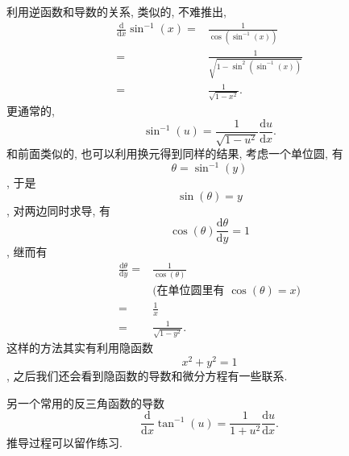 利用逆函数和导数的关系, 类似的, 不难推出, \[
\begin{aligned}
\frac{\mathrm{d}}{\mathrm{d}x}\sin^{-1}(x)=&\frac{1}{\cos(\sin^{-1}(x))}\\
=&\frac{1}{\sqrt{1-\sin^2(\sin^{-1}(x))}}\\
=&\frac{1}{\sqrt{1-x^2}}.
\end{aligned}
\] 更通常的, \[
\boxed{\sin^{-1}(u)=\frac{1}{\sqrt{1-u^2}}\frac{\mathrm{d}u}{\mathrm{d}x}}.
\] 和前面类似的, 也可以利用换元得到同样的结果, 考虑一个单位圆, 有
\[\theta=\sin^{-1}(y)\], 于是 \[\sin(\theta)=y\], 对两边同时求导, 有
\[\cos(\theta)\frac{\mathrm{d}\theta}{\mathrm{d}y}=1\], 继而有 \[
\begin{aligned}
\frac{\mathrm{d}\theta}{\mathrm{d}y}=&\frac{1}{\cos(\theta)}\\
&\text{(在单位圆里有 }\cos(\theta)= x\text{)}\\
=&\frac{1}{x}\\
=&\frac{1}{\sqrt{1-y^2}}.
\end{aligned}
\] 这样的方法其实有利用隐函数 \[x^2+y^2=1\],
之后我们还会看到隐函数的导数和微分方程有一些联系.

另一个常用的反三角函数的导数 \[
\boxed{\frac{\mathrm{d}}{\mathrm{d}x}\tan^{-1}(u)=\frac{1}{1+u^2}\frac{\mathrm{d}u}{\mathrm{d}x}}.
\] 推导过程可以留作练习.
